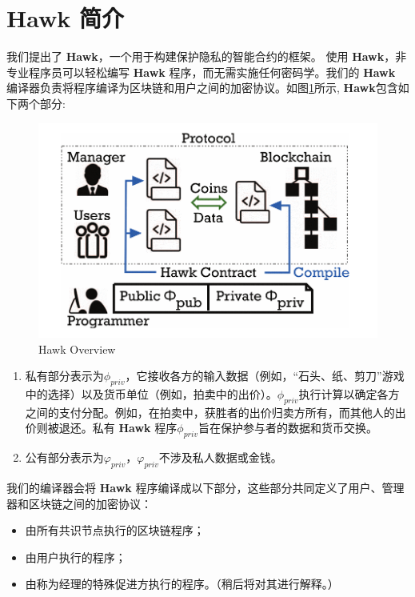 \documentclass{xduugtrans}
\begin{document}
\section{Hawk 简介}
我们提出了 \textbf{Hawk}，一个用于构建保护隐私的智能合约的框架。 使用 \textbf{Hawk}，非专业程序员可以轻松编写 \textbf{Hawk} 程序，而无需实施任何密码学。我们的 \textbf{Hawk} 编译器负责将程序编译为区块链和用户之间的加密协议。如图\ref{fig1}所示, \textbf{Hawk}包含如下两个部分: 

\begin{figure}
    \centering
    \includegraphics[width=.8\linewidth]{1}
    \caption{Hawk Overview}
    \label{fig1}
\end{figure}

\begin{enumerate}
    \item 私有部分表示为$\phi _{priv}$，它接收各方的输入数据（例如，“石头、纸、剪刀”游戏中的选择）以及货币单位（例如，拍卖中的出价）。$\phi _{priv}$执行计算以确定各方之间的支付分配。例如，在拍卖中，获胜者的出价归卖方所有，而其他人的出价则被退还。私有 \textbf{Hawk} 程序$\phi _{priv}$旨在保护参与者的数据和货币交换。 
    \item 公有部分表示为$\varphi  _{priv}$，$\varphi  _{priv}$不涉及私人数据或金钱。
\end{enumerate}

我们的编译器会将 \textbf{Hawk} 程序编译成以下部分，这些部分共同定义了用户、管理器和区块链之间的加密协议：

\begin{itemize}
    \item 由所有共识节点执行的区块链程序；
    \item 由用户执行的程序；
    \item 由称为经理的特殊促进方执行的程序。（稍后将对其进行解释。）
\end{itemize}
\end{document}
